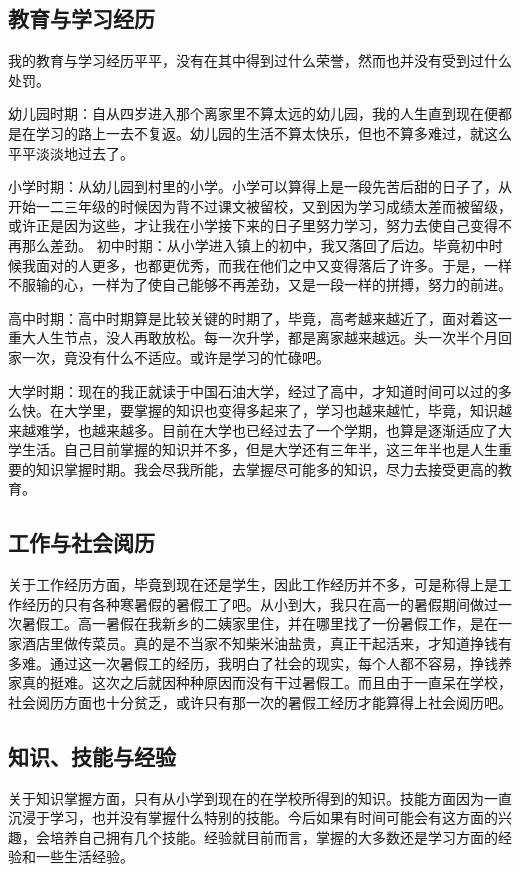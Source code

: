 \documentclass{article}
\begin{document}
\subsection{教育与学习经历}
我的教育与学习经历平平，没有在其中得到过什么荣誉，然而也并没有受到过什么处罚。\par
幼儿园时期：自从四岁进入那个离家里不算太远的幼儿园，我的人生直到现在便都是在学习的路上一去不复返。幼儿园的生活不算太快乐，但也不算多难过，就这么平平淡淡地过去了。\par 
小学时期：从幼儿园到村里的小学。小学可以算得上是一段先苦后甜的日子了，从开始一二三年级的时候因为背不过课文被留校，又到因为学习成绩太差而被留级，或许正是因为这些，才让我在小学接下来的日子里努力学习，努力去使自己变得不再那么差劲。
初中时期：从小学进入镇上的初中，我又落回了后边。毕竟初中时候我面对的人更多，也都更优秀，而我在他们之中又变得落后了许多。于是，一样不服输的心，一样为了使自己能够不再差劲，又是一段一样的拼搏，努力的前进。\par 
高中时期：高中时期算是比较关键的时期了，毕竟，高考越来越近了，面对着这一重大人生节点，没人再敢放松。每一次升学，都是离家越来越远。头一次半个月回家一次，竟没有什么不适应。或许是学习的忙碌吧。\par 
大学时期：现在的我正就读于中国石油大学，经过了高中，才知道时间可以过的多么快。在大学里，要掌握的知识也变得多起来了，学习也越来越忙，毕竟，知识越来越难学，也越来越多。目前在大学也已经过去了一个学期，也算是逐渐适应了大学生活。自己目前掌握的知识并不多，但是大学还有三年半，这三年半也是人生重要的知识掌握时期。我会尽我所能，去掌握尽可能多的知识，尽力去接受更高的教育。\par
\subsection{工作与社会阅历}
关于工作经历方面，毕竟到现在还是学生，因此工作经历并不多，可是称得上是工作经历的只有各种寒暑假的暑假工了吧。从小到大，我只在高一的暑假期间做过一次暑假工。高一暑假在我新乡的二姨家里住，并在哪里找了一份暑假工作，是在一家酒店里做传菜员。真的是不当家不知柴米油盐贵，真正干起活来，才知道挣钱有多难。通过这一次暑假工的经历，我明白了社会的现实，每个人都不容易，挣钱养家真的挺难。这次之后就因种种原因而没有干过暑假工。而且由于一直呆在学校，社会阅历方面也十分贫乏，或许只有那一次的暑假工经历才能算得上社会阅历吧。\par
\subsection{知识、技能与经验}
关于知识掌握方面，只有从小学到现在的在学校所得到的知识。技能方面因为一直沉浸于学习，也并没有掌握什么特别的技能。今后如果有时间可能会有这方面的兴趣，会培养自己拥有几个技能。经验就目前而言，掌握的大多数还是学习方面的经验和一些生活经验。\par
\end{document}
